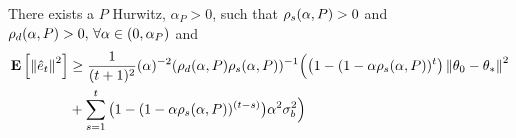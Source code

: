 \begin{theorem}
There exists a $P$ Hurwitz, $\alpha_P>0$, such that $\rho_s(\alpha,P)>0$ and $\rho_d(\alpha,P)>0,\,\forall \alpha\in (0,\alpha_P)$ and
\begin{align*}
\mathbf{E}\left[\left\| \hat{e}_t\right\|^2\right] &\geq \frac{1}{(t+1)^2}(\alpha)^{-2}(\rho_d(\alpha,P)\rho_s(\alpha,P))^{-1}\Big( \big(1-(1-\alpha \rho_s(\alpha,P))^t\big) \left\| \theta_0-\theta_*\right\|^2 \\&+ \sum_{s=1}^t \big(1-(1-\alpha \rho_s(\alpha,P))^{(t-s)}\big) \alpha^2 \sigma^2_b \Big)
\end{align*}

\begin{comment}
\begin{align}
\frac{1}{(t+1)^2}(\alpha \lambda_{\min})^{-2}(1-\alpha \lambda_{\min}^t) \theta^2_0(1)\leq \norm{\eh_t}^2\leq
\frac{1}{(t+1)^2} \left(\alpha^{-1}\rhos{P^0}+\alpha^{-2}\rhos{P^0}^2\right)\norm{\theta_0}^2
\end{align}
\end{comment}
\end{theorem}

\begin{comment}

Consider the LSA with $b_t=0$, and $P^0$ has all the mass concentrated on $A_{P^0}=\begin{bmatrix} \lambda_{\min} &0\\ 0& \lambda_{\max}\end{bmatrix}$, for some $\lambda_{\max}>\lambda_{\min}>0$. Note that in this example $\ts=0$.
By choosing $\alpha<\frac2{\lambda_{\max}}$, in this case it is straightforward to write the expression for $\eh_t$ explicitly as below:
\begin{align*}
\eh_t&=\frac{1}{t+1}\sum_{s=0}^t e_t = \frac{1}{t+1}\sum_{s=0}^t (I-\alpha A_P)^{t-s} e_0\\
&=\frac{1}{t+1}(\alpha A)^{-1}\left(I-(I-\alpha A)^{t+1}\right)e_0
\end{align*}

\begin{align*}
\norm{\eh_t}^2&=\frac{1}{(t+1)^2}\norm{(\alpha A_P)^{-1}\left(I-(I-\alpha A_P)^{t+1}\right)e_0}^2
&\leq\frac{1}{(t+1)^2}\alpha^2\norm{A_P^{-1}}^2\norm{e_0}^2
\end{align*}

\begin{align*}
\norm{\eh_t}^2\geq \eh^2_t(1)=\frac{1}{(t+1)^2}(\alpha \lambda_{\min})^{-2}(1-\alpha \lambda_{\min}^t) \theta^2_0(1)
\end{align*}
Note that in this example, $\rhos{P^0}=\rhod{P^0}=\lambda_{\min} -\alpha \lambda_{\min}^2=\lambda_{\min}(1-\alpha \lambda_{\min})$. Sandwiching the error between the lower and upper bounds we have
\begin{align}
\frac{1}{(t+1)^2}(\alpha \lambda_{\min})^{-2}(1-\alpha \lambda_{\min}^t) \theta^2_0(1)\leq \norm{\eh_t}^2\leq
\frac{1}{(t+1)^2} \left(\alpha^{-1}\rhos{P^0}+\alpha^{-2}\rhos{P^0}^2\right)\norm{\theta_0}^2
\end{align}
\end{comment}

